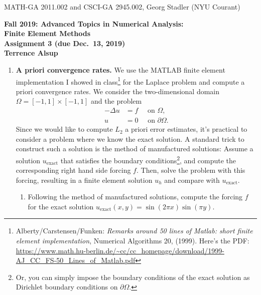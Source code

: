 \documentclass[11pt]{article}
\begin{document}
\begin{center}
  \vspace*{-2cm}
{\small MATH-GA 2011.002 and CSCI-GA 2945.002, Georg Stadler (NYU Courant)}
\end{center}
\vspace*{.5cm}
\begin{center}
\large \textbf{%
Fall 2019: Advanced Topics in Numerical Analysis: \\
Finite Element Methods \\
Assignment 3 (due Dec.\ 13, 2019)}\\
\vspace*{0.5cm}
\large \textbf{Terrence Alsup }
\end{center}


\begin{enumerate}
\item {\bf A priori convergence rates.}  We use the MATLAB finite
  element implementation I showed in
  class\footnote{Alberty/Carstensen/Funken: \emph{Remarks around 50
      lines of Matlab: short finite element implementation}, Numerical
    Algorithms 20, (1999). Here's the PDF: \url{https://www.math.hu-berlin.de/~cc/cc_homepage/download/1999-AJ_CC_FS-50_Lines_of_Matlab.pdf}}  for the Laplace problem and compute a
  priori convergence rates. We consider the two-dimensional domain
  $\Omega=[-1,1]\times [-1,1]$ and the problem
  \begin{align*}
    -\Delta u  &= f \quad \text{ on } \Omega,\\
    u &= 0  \quad \text{ on } \partial \Omega.
  \end{align*}
    Since we would like to compute $L_2$ a priori error estimates,
    it's practical to consider a problem where we know the exact
    solution. A standard trick to construct such a solution is the
    method of manufactured solutions: Assume a solution
    $u_{\text{exact}}$ that satisfies the boundary
    conditions\footnote{Or, you can simply impose the boundary
      conditions of the exact solution as Dirichlet boundary
      conditions on $\partial\Omega$.}, and compute the corresponding
    right hand side forcing $f$.  Then, solve the problem with this
    forcing, resulting in a finite element solution $u_h$ and compare
    with $u_{\text{exact}}$.
  \begin{enumerate}
  \item Following the method of manufactured solutions, compute the
    forcing $f$ for the exact solution $u_{\text{exact}}(x,y) =
    \sin(2\pi x)\sin(\pi y)$.
  \end{enumerate}


\end{enumerate}
\end{document}
